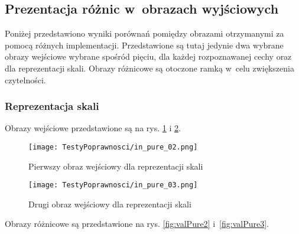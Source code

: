 \subsection{Prezentacja różnic w~obrazach wyjściowych}
\label{subsec:prezentacjaObrazowRoznicowych}

Poniżej przedstawiono wyniki porównań pomiędzy obrazami otrzymanymi za pomocą różnych implementacji. Przedstawione są tutaj jedynie dwa wybrane obrazy wejściowe wybrane spośród pięciu, dla każdej rozpoznawanej cechy oraz dla reprezentacji skali. Obrazy różnicowe są otoczone ramką w~celu zwiększenia czytelności.

\subsubsection{Reprezentacja skali}
\label{subsubsec:reprezentacjaSkaliRysunki}

Obrazy wejściowe przedstawione są na rys. \ref{fig:valPure02} i \ref{fig:valPure03}.

\begin{figure}[h]
\begin{center}
\texttt{[image: TestyPoprawnosci/in\_pure\_02.png]}
\end{center}
\caption{Pierwszy obraz wejściowy dla reprezentacji skali}
\label{fig:valPure02}
\end{figure}

\begin{figure}[h]
\begin{center}
\texttt{[image: TestyPoprawnosci/in\_pure\_03.png]}
\end{center}
\caption{Drugi obraz wejściowy dla reprezentacji skali}
\label{fig:valPure03}
\end{figure}

Obrazy różnicowe są przedstawione na rys. \ref{fig:valPure2} i~\ref{fig:valPure3}. 

